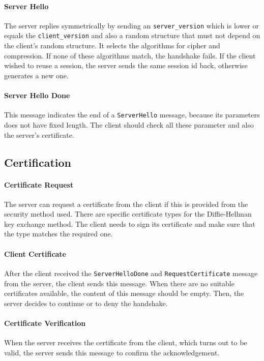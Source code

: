\documentclass[paper=a4, fontsize=11pt]{scrartcl} %
\numberwithin{equation}{section} %
\numberwithin{figure}{section} %
\numberwithin{table}{section} %
\begin{document}
\paragraph{Server Hello} The server replies symmetrically by sending an \verb|server_version| which is lower or equals the \verb|client_version| and also a random structure that must not depend on the client's random structure. It selects the algorithms for cipher and compression. If none of these algorithms match, the handshake fails. If the client wished to reuse a session, the server sends the same session id back, otherwise generates a new one.
\paragraph{Server Hello Done}
This message indicates the end of a \verb|ServerHello| message, because its parameters does not have fixed length. The client should check all these parameter and also the server's certificate.

\subsection{Certification}
\paragraph{Certificate Request}
The server can request a certificate from the client if this is provided from the security method used. There are specific certificate types for the Diffie-Hellman key exchange method. The client needs to sign its certificate and make sure that the type matches the required one.
\paragraph{Client Certificate}
\begin{sloppypar}
After the client received the \verb|ServerHelloDone| and \verb|RequestCertificate| message from the server, the client sends this message. When there are no suitable certificates available, the content of this message should be empty. Then, the server decides to continue or to deny the handshake.
\end{sloppypar}
\paragraph{Certificate Verification}
When the server receives the certificate from the client, which turns out to be valid, the server sends this message to confirm the acknowledgement.
\end{document}
